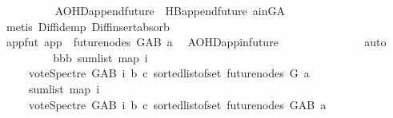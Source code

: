 \begin{isabellebody}
\ \ \ \ \ \ \ \ \isamarkupfalse%
\ AOHD{\isachardot}{\kern0pt}append{\isacharunderscore}{\kern0pt}future\ {}{\isacharparenleft}{\kern0pt}{}{\isacharparenright}{\kern0pt}\ HB{}{\isachardot}{\kern0pt}append{\isacharunderscore}{\kern0pt}future\ a{\isacharunderscore}{\kern0pt}in{\isacharunderscore}{\kern0pt}G{\isacharunderscore}{\kern0pt}A\isanewline
\ \ \ \ \ \ \ \ \isamarkupfalse%
\ {\isacharparenleft}{\kern0pt}metis\ Diff{\isacharunderscore}{\kern0pt}idemp\ Diff{\isacharunderscore}{\kern0pt}insert{\isacharunderscore}{\kern0pt}absorb{\isacharparenright}{\kern0pt}\ \ \ \isanewline
\ \ \ \ \ \ \isamarkupfalse%
\ \isamarkupfalse%
\ appfut{\isacharcolon}{\kern0pt}\ {\isachardoublequoteopen}app\ {\isasymin}\ future{\isacharunderscore}{\kern0pt}nodes\ G{\isacharunderscore}{\kern0pt}AB\ a{\isachardoublequoteclose}\ \isamarkupfalse%
\ AOHD{\isachardot}{\kern0pt}app{\isacharunderscore}{\kern0pt}in{\isacharunderscore}{\kern0pt}future{}\ \ \isanewline
\ \ \ \ \ \ \ \ \ \ {}{\isacharparenleft}{\kern0pt}{}{\isacharparenright}{\kern0pt}\ \isamarkupfalse%
\ auto\isanewline
\ \ \ \ \ \ \isamarkupfalse%
\ \isamarkupfalse%
\ bbb{\isacharcolon}{\kern0pt}\ {\isachardoublequoteopen}sum{\isacharunderscore}{\kern0pt}list\ {\isacharparenleft}{\kern0pt}map\ {\isacharparenleft}{\kern0pt}{\isasymlambda}i{\isachardot}{\kern0pt}\isanewline
\ \ \ \ \ {\isacharparenleft}{\kern0pt}vote{\isacharunderscore}{\kern0pt}Spectre\ G{\isacharunderscore}{\kern0pt}AB\ i\ b\ c{\isacharparenright}{\kern0pt}{\isacharparenright}{\kern0pt}\ {\isacharparenleft}{\kern0pt}sorted{\isacharunderscore}{\kern0pt}list{\isacharunderscore}{\kern0pt}of{\isacharunderscore}{\kern0pt}set\ {\isacharparenleft}{\kern0pt}future{\isacharunderscore}{\kern0pt}nodes\ G\ a{\isacharparenright}{\kern0pt}{\isacharparenright}{\kern0pt}{\isacharparenright}{\kern0pt}\isanewline
\ \ \ \ {\isacharequal}{\kern0pt}\ sum{\isacharunderscore}{\kern0pt}list\ {\isacharparenleft}{\kern0pt}map\ {\isacharparenleft}{\kern0pt}{\isasymlambda}i{\isachardot}{\kern0pt}\isanewline
\ \ \ \ \ {\isacharparenleft}{\kern0pt}vote{\isacharunderscore}{\kern0pt}Spectre\ G{\isacharunderscore}{\kern0pt}AB\ i\ b\ c{\isacharparenright}{\kern0pt}{\isacharparenright}{\kern0pt}\ {\isacharparenleft}{\kern0pt}sorted{\isacharunderscore}{\kern0pt}list{\isacharunderscore}{\kern0pt}of{\isacharunderscore}{\kern0pt}set\ {\isacharparenleft}{\kern0pt}future{\isacharunderscore}{\kern0pt}nodes\ G{\isacharunderscore}{\kern0pt}AB\ a{\isacharparenright}{\kern0pt}{\isacharparenright}{\kern0pt}{\isacharparenright}{\kern0pt}\isanewline

\end{isabellebody}
